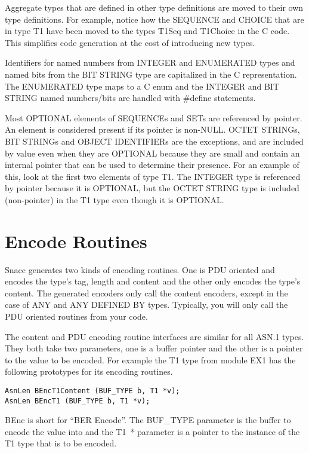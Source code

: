 Aggregate types that are defined in other type definitions are moved
to their own type definitions.  For example, notice how the SEQUENCE
and CHOICE that are in type {\C T1} have been moved to the types
{\C T1Seq} and {\C T1Choice} in the C code.  This simplifies code
generation at the cost of introducing new types.

Identifiers for named numbers from INTEGER and ENUMERATED types and
named bits from the BIT STRING type are capitalized in the C
representation.  The ENUMERATED type maps to a C {\C enum} and the INTEGER
and BIT STRING named numbers/bits are handled with {\C \#define}
statements.

Most OPTIONAL elements of SEQUENCEs and SETs are referenced by
pointer.  An element is considered present if its pointer is non-NULL\@.
OCTET STRINGs, BIT STRINGs and OBJECT IDENTIFIERs are the exceptions,
and are included by value even when they are OPTIONAL because they are
small and contain an internal pointer that can be used to determine
their presence.  For an example of this, look at the first two
elements of type {\C T1}.  The INTEGER type is referenced by pointer
because it is OPTIONAL, but the OCTET STRING type is included
(non-pointer) in the {\C T1} type even though it is OPTIONAL\@.


\section{\label{encode-gen-C-section}Encode Routines}

Snacc generates two kinds of encoding routines. One is PDU oriented
and encodes the type's tag, length and content and the other
only encodes the type's content.  The generated encoders only call the
content encoders, except in the case of ANY and ANY DEFINED BY types.
Typically, you will only call the PDU oriented routines from your
code.

The content and PDU encoding routine interfaces are similar for all
ASN.1 types.  They both take two parameters, one is a buffer pointer
and the other is a pointer to the value to be encoded.  For example
the {\C T1} type from module EX1 has the following prototypes for
its encoding routines.

\begin{verbatim}
AsnLen BEncT1Content (BUF_TYPE b, T1 *v);
AsnLen BEncT1 (BUF_TYPE b, T1 *v);
\end{verbatim}

{\C BEnc} is short for ``BER Encode''. The {\C BUF\_TYPE}
parameter is the buffer to encode the value into and the {\C T1~*}
parameter is a pointer to the instance of the {\C T1} type that is to be
encoded.


